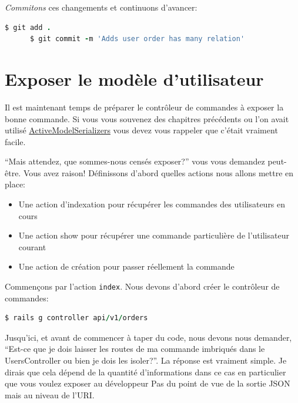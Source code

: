 \documentclass[]{report}
\begin{document}
    \textit{Commitons} ces changements et continuons d'avancer:

    \begin{scriptsize}
      \begin{lstlisting}[language=ruby]
      $ git add .
      $ git commit -m 'Adds user order has many relation'
      \end{lstlisting}
    \end{scriptsize}

  \section{Exposer le modèle d'utilisateur}

    Il est maintenant temps de préparer le contrôleur de commandes à exposer la bonne commande. Si vous vous souvenez des chapitres précédents ou l'on avait utilisé \href{https://github.com/rails-api/active_model_serializers}{ActiveModelSerializers} vous devez vous rappeler que c'était vraiment facile.

    \enquote{Mais attendez, que sommes-nous censés exposer?} vous vous demandez peut-être. Vous avez raison! Définissons d'abord quelles actions nous allons mettre en place:

    \begin{itemize}
      \item Une action d'indexation pour récupérer les commandes des utilisateurs en cours
      \item Une action show pour récupérer une commande particulière de l'utilisateur courant
      \item Une action de création pour passer réellement la commande
    \end{itemize}


    Commençons par l'action \verb|index|. Nous devons d'abord créer le contrôleur de commandes:

    \begin{scriptsize}
      \begin{lstlisting}[language=ruby]
      $ rails g controller api/v1/orders
      \end{lstlisting}
    \end{scriptsize}

    Jusqu'ici, et avant de commencer à taper du code, nous devons nous demander, \enquote{Est-ce que je dois laisser les routes de ma commande imbriqués dans le UsersController ou bien je dois les isoler?}. La réponse est vraiment simple. Je dirais que cela dépend de la quantité d'informations dans ce cas en particulier que vous voulez exposer au développeur Pas du point de vue de la sortie JSON mais au niveau de l'URI.
\end{document}
